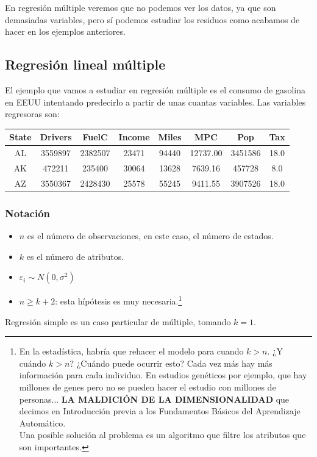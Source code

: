 \documentclass[palatino,nochap]{apuntes}
\begin{document}
En regresión múltiple veremos que no podemos ver los datos, ya que son demasiadas variables, pero sí podemos estudiar los residuos como acabamos de hacer en los ejemplos anteriores.

\subsection{Regresión lineal múltiple}

El ejemplo que vamos a estudiar en regresión múltiple es el consumo de gasolina en EEUU intentando predecirlo a partir de unas cuantas variables. Las variables regresoras son:

\begin{center}
\begin{tabular}{cccccccc}
State&Drivers&FuelC&Income&Miles&MPC&Pop&Tax\\\hline
AL&3559897&2382507&23471&94440&12737.00&3451586&18.0\\
AK&472211&235400&30064&13628&7639.16&457728&8.0\\
AZ&3550367&2428430&25578&55245&9411.55&3907526&18.0
\end{tabular}
\end{center}

\subsubsection{Notación}


\begin{itemize}
	\item $n$ es el número de observaciones, en este caso, el número de estados.
	\item $k$ es el número de atributos.
	\item $ε_i \sim N(0,σ^2)$
	\item $n\geq k+2$: esta hípótesis  es muy necesaria.\footnote{En la estadística, habría que rehacer el modelo para cuando $k>n$. ¿Y cuándo $k>n$? ¿Cuándo puede ocurrir esto? Cada vez más hay más información para cada individuo. En estudios genéticos por ejemplo, que hay millones de genes pero no se pueden hacer el estudio con millones de personas... \textbf{LA MALDICIÓN DE LA DIMENSIONALIDAD} que decimos en Introducción previa a los Fundamentos Básicos del Aprendizaje Automático.\\ Una posible solución al problema es un algoritmo que filtre los atributos que son importantes.}
\end{itemize}

Regresión simple es un caso particular de múltiple, tomando $k=1$.
\end{document}
